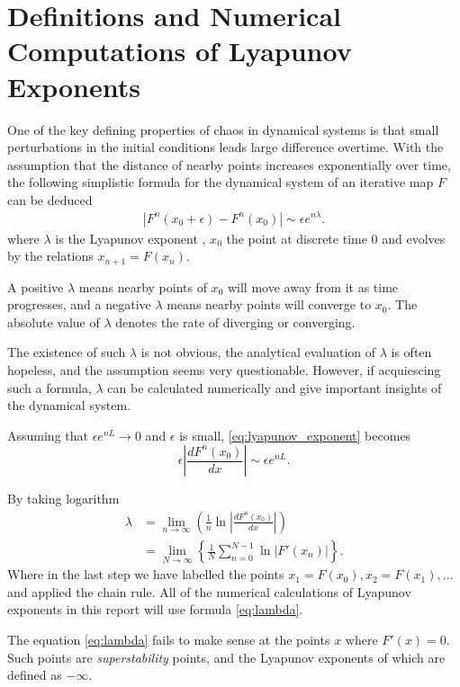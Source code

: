 \section{Definitions and Numerical Computations of Lyapunov Exponents}

One of the key defining properties of chaos in dynamical systems is that small perturbations in the initial conditions leads large difference overtime.
With the assumption that the distance of nearby points increases exponentially over time, the following simplistic formula for the dynamical system of an iterative map $F$ can be deduced
\begin{align}\label{eq:lyapunov_exponent}
    \left|F^n(x_0+\epsilon)-F^n(x_0)\right| \sim \epsilon e^{n \lambda}.
\end{align}
where $\lambda$ is the Lyapunov exponent \cite{nonlinear_system} \cite{lyapunov}, $x_0$ the point at discrete time $0$ and evolves by the relations $x_{n+1} = F(x_n)$.

A positive $\lambda$ means nearby points of $x_0$ will move away from it as time progresses, and a negative $\lambda$ means nearby points will converge to $x_0$. 
The absolute value of $\lambda$ denotes the rate of diverging or converging.

The existence of such $\lambda$ is not obvious, the analytical evaluation of $\lambda$ is often hopeless, and the assumption seems very questionable.
However, if acquiescing such a formula, $\lambda$ can be calculated numerically and give important insights of the dynamical system. 


Assuming that $\epsilon e^{nL} \to 0$ and $\epsilon$ is small, \eqref{eq:lyapunov_exponent} becomes
$$
\epsilon \left| \frac{dF^n(x_0)}{dx} \right| \sim \epsilon e^{nL}.
$$

By taking logarithm
\begin{align}
    \lambda 
    &= \lim_{n \to \infty}\left(\frac{1}{n}\ln{\left|\frac{dF^n(x_0)}{dx}\right|}\right)  \\
    &= \lim_{N \to \infty}\left\{\frac{1}{N}\sum_{n=0}^{N-1}\ln{|F'(x_n)|}\right\}  \label{eq:lambda}.
\end{align}
Where in the last step we have labelled the points $x_1 = F(x_0), x_2 = F(x_1), \dots$ and applied the chain rule.
All of the numerical calculations of Lyapunov exponents in this report will use formula \eqref{eq:lambda}.

The equation \eqref{eq:lambda} fails to make sense at the points $x$ where $F'(x) = 0$.
Such points are \emph{superstability} points, and the Lyapunov exponents of which are defined as $- \infty$.

